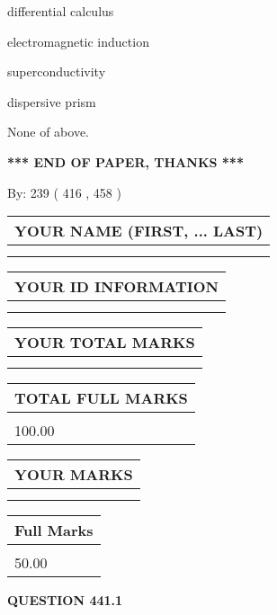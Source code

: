 \documentclass[12pt]{article}
\begin{document}
 
differential calculus
 
 
electromagnetic induction
 
 
superconductivity
 
 
dispersive prism
 
 
 None of above.
 
 
   
   
\vspace{1.0in} 
{\textbf{\large{ *** END OF PAPER, THANKS *** }}} 
   
   
\hspace{1.0in} By: 
 239 ( 416 ,  458 )
   
   
   
   
\newpage 
\setcounter{page}{ 
   441001 } 
   
   
   
   
\noindent\begin{tabular}{|l|}
\hline
YOUR NAME (FIRST, ... LAST)  \\
\hline
 \\ 
 \\ 
\hline
\end{tabular}
\hspace{0.05in} \begin{tabular}{|l|}
\hline
 YOUR   ID   INFORMATION  \\
\hline
 \\ 
 \\ 
\hline
\end{tabular}
   
   
\vspace{0.2in}\noindent\begin{tabular}{|l|}
\hline
YOUR TOTAL MARKS  \\
\hline
 \\ 
 \\ 
\hline
\end{tabular}
\hspace{0.05in} \begin{tabular}{|l|}
\hline
TOTAL FULL MARKS  \\
\hline
 \\ 
100.00 \\
\hline
\end{tabular}
  
\vspace{0.2in}
  
\noindent\begin{tabular}{|l|}
\hline
 YOUR MARKS  \\
\hline
 \\ 
 \\ 
\hline
\end{tabular}
\hspace{0.05in} \begin{tabular}{|l|}
\hline
 Full Marks  \\
\hline
 \\ 
50.00 \\
\hline
\end{tabular}
{\textbf{\Large{QUESTION
441.1 
}}}
  
\end{document}

